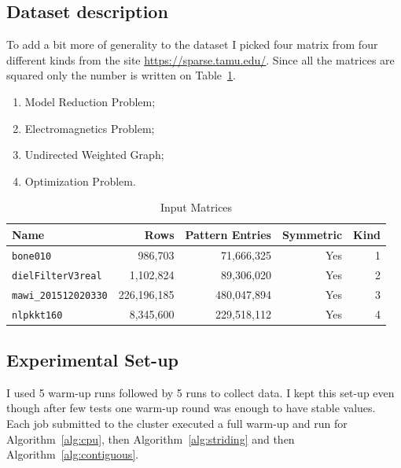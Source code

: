 \documentclass[conference]{IEEEtran}
\begin{document}
\subsection{Dataset description}


To add a bit more of generality to the dataset I picked four matrix from four different kinds from the site \url{https://sparse.tamu.edu/}. Since all the matrices are squared only the number is written on Table~\ref{tab:dataset}.

\begin{enumerate}
\item Model Reduction Problem;
\item Electromagnetics Problem;
\item Undirected Weighted Graph;
\item Optimization Problem.
\end{enumerate}

\begin{table}[h]
    \centering
    \begin{tabular}{lrrrr}
    \toprule
    \textbf{Name} & \textbf{Rows} & \textbf{Pattern Entries} & \textbf{Symmetric} & \textbf{Kind}\\
    \midrule
    \texttt{bone010} & 986,703 & 71,666,325 & Yes & 1\\
      \texttt{dielFilterV3real} & 1,102,824 & 89,306,020 & Yes & 2\\
      \texttt{mawi\_201512020330} & 226,196,185 & 480,047,894 & Yes & 3\\
      \texttt{nlpkkt160} &8,345,600 & 229,518,112 & Yes & 4\\
      \bottomrule
    \end{tabular}
    \vspace{.5em}
    \caption{Input Matrices}
    \label{tab:dataset}
\end{table}

\subsection{Experimental Set-up}
I used 5 warm-up runs followed by 5 runs to collect data. I kept this set-up even though after few tests one warm-up round was enough to have stable values. Each job submitted to the cluster executed a full warm-up and run for Algorithm~\ref{alg:cpu}, then Algorithm~\ref{alg:striding} and then Algorithm~\ref{alg:contiguous}. 
\end{document}
